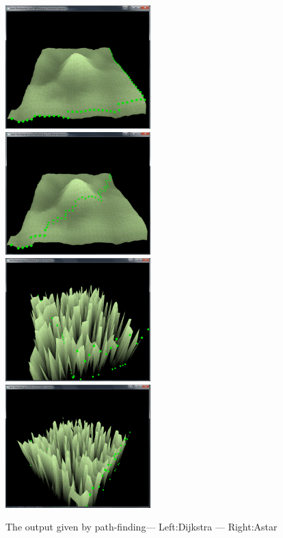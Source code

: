 \documentclass[12pt,a4paper]{article}
\begin{document}
\begin{figure}[H]
	\includegraphics[width=0.5\textwidth]{images/Dijkstra}
	\includegraphics[width=0.5\textwidth]{images/Astar}
	\includegraphics[width=0.5\textwidth]{images/RMFDijkstra}
	\includegraphics[width=0.5\textwidth]{images/RMFastar}
	\caption{The output given by path-finding--- Left:Dijkstra --- Right:Astar} \label{Dijkstrafind}
\end{figure}
\end{document}
